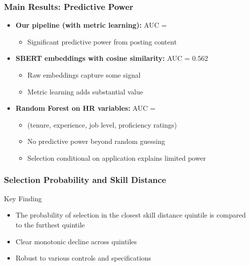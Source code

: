 \documentclass[11pt,xcolor={dvipsnames},hyperref={pdftex,pdfpagemode=UseNone,hidelinks,pdfdisplaydoctitle=true},usepdftitle=false]{beamer}
\begin{document}
\begin{frame}
\frametitle{Main Results: Predictive Power}
\begin{itemize}
\item \textbf{Our pipeline (with metric learning):} AUC = 
\begin{itemize}
\item Significant predictive power from posting content
\end{itemize}

\item \textbf{SBERT embeddings with cosine similarity:} AUC = 0.562
\begin{itemize}
\item Raw embeddings capture some signal
\item Metric learning adds substantial value
\end{itemize}

\item \textbf{Random Forest on HR variables:} AUC = 
\begin{itemize}
\item (tenure, experience, job level, proficiency ratings)
\item No predictive power beyond random guessing
\item Selection conditional on application explains limited power
\end{itemize}
\end{itemize}
\end{frame}

\begin{frame}
\frametitle{Selection Probability and Skill Distance}
\begin{center}
\end{center}

\begin{block}{Key Finding}
\begin{itemize}
\item The probability of selection in the closest skill distance quintile is  compared to the furthest quintile
\item Clear monotonic decline across quintiles
\item Robust to various controls and specifications
\end{itemize}
\end{block}
\end{frame}
\end{document}
